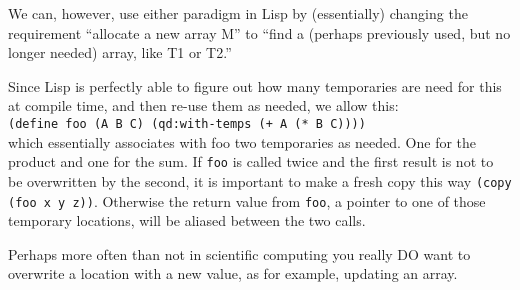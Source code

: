 \documentclass{article}
\begin{document}
We can, however, use either paradigm in Lisp by (essentially) changing
the requirement ``allocate a new array M'' to ``find a (perhaps
previously used, but no longer needed) array, like T1 or T2.''

Since Lisp is perfectly able to figure out how many temporaries are
need for this at compile time, and then re-use them as needed, we
allow this:\\

{\tt (define foo (A B C) (qd:with-temps (+ A (* B C))))}\\
which essentially associates with foo two temporaries as needed.
One for the product and one for the sum.
If  {\tt foo} is called twice and the
first result is not to be overwritten by the second, it is
important to make a fresh copy this way
 {\tt (copy (foo x y z))}.  Otherwise the return value from {\tt foo},
a pointer to one of those temporary locations, will be aliased between
the two calls.

Perhaps more often than not in scientific computing
you really DO want to overwrite a location with a new value,
as for example, updating an array.
\end{document}

